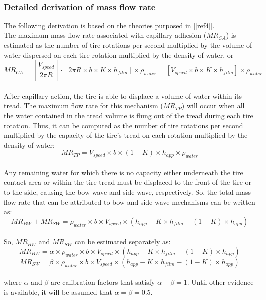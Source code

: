 \documentclass[12pt]{article}
\newcommand{\reref}[1]{\ref{#1}}
\begin{document}
\begin{minipage}{\textwidth}
\end{minipage}\\


\subsubsection*{Detailed derivation of mass flow rate}

The following derivation is based on the theories purposed in [\reref{ref4}].\\
The maximum mass flow rate associated with capillary adhesion ($\mathit{MR_{CA}}$) is estimated as the number of tire rotations per second multiplied by the volume of water dispersed on each tire rotation multiplied by the density of water, or
 \[ 
\mathit{MR_{CA}} = \left[\frac{V_{speed}}{2\pi R}\right] \cdot \left[ 2\pi R \times b \times K \times h_{film} \right] \times \rho_{water} = \left[V_{speed} \times b \times K \times h_{film} \right] \times  \rho_{water} 
\]
\\
After capillary action, the tire is able to displace a volume of water within its tread. The maximum flow rate for this mechanism ($\mathit{MR_{TP}}$) will occur when all the water contained in the tread volume is flung out of the tread during each tire rotation. Thus, it can be computed as the number of tire rotations per second multiplied by the capacity of the tire’s tread on each rotation multiplied by the density of water:
 \[ 
\mathit{MR_{TP}} = V_{speed} \times b \times (1-K) \times h_{app} \times \rho_{water} 
\]
\\
Any remaining water for which there is no capacity either underneath the tire contact area or within the tire tread must be displaced to the front of the tire or to the side, causing the bow wave and side wave, respectively. So, the total mass flow rate that can be attributed to bow and side wave mechanisms can be written as:
 \[ 
\mathit{MR_{BW} + MR_{SW}} =  \rho_{water} \times b \times V_{speed} \times (h_{app} - K \times h_{film} - (1-K) \times h_{app}) \]
\\
So, $\mathit{MR_{BW}}$ and $\mathit{MR_{SW}}$ can be estimated separately as:
 \[ 
\mathit{MR_{BW}} =  \alpha \times \rho_{water} \times b \times V_{speed} \times (h_{app} - K \times h_{film} - (1-K) \times h_{app}) \]
 \[
\mathit{MR_{SW}} = \beta \times \rho_{water} \times b \times V_{speed} \times (h_{app} - K \times h_{film} - (1-K) \times h_{app}) \]
\\
where $\alpha$ and $\beta$ are calibration factors that satisfy $\alpha + \beta = 1$. Until other evidence is available, it will be assumed that $\alpha = \beta = 0.5$.
\end{document}
